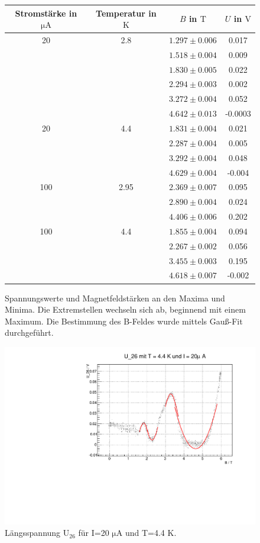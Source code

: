 \begin{figure} [h]
\centering
\caption{Spannungswerte und Magnetfeldstärken an den Maxima und Minima. Die Extremstellen wechseln sich ab, beginnend mit einem Maximum. Die Bestimmung des B-Feldes wurde mittels Gauß-Fit durchgeführt.}
\vspace*{0.5cm}
\begin{tabular}{cccc}
\hline
Stromstärke in $\mathrm{\mu A}$ & Temperatur in $\mathrm{K}$ & $B$ in $\mathrm{T}$ & $U$ in $\mathrm{V}$ \\
\hline
\hline
20	& 2.8	& $1.297 \pm 0.006$ & 0.017 \\
	&		& $1.518 \pm 0.004$ & 0.009 \\
	&		& $1.830 \pm 0.005$ & 0.022 \\
	&		& $2.294 \pm 0.003$ & 0.002 \\
	&		& $3.272 \pm 0.004$ & 0.052 \\
	&		& $4.642 \pm 0.013$ & -0.0003 \\
20  & 4.4  & $1.831 \pm 0.004$ & 0.021 \\
	&		& $2.287 \pm 0.004$ & 0.005 \\
	&		& $3.292 \pm 0.004$ & 0.048 \\
	&		& $4.629 \pm 0.004$ & -0.004 \\
100 & 2.95  & $2.369 \pm 0.007$ & 0.095 \\
	&		& $2.890 \pm 0.004$ & 0.024 \\
	&		& $4.406 \pm 0.006$ & 0.202 \\
100 & 4.4  & $1.855 \pm 0.004$ & 0.094 \\
	&		& $2.267 \pm 0.002$ & 0.056 \\
	&		& $3.455 \pm 0.003$ & 0.195 \\
	&		& $4.618 \pm 0.007$ & -0.002 \\
\hline
\end{tabular}
\end{figure}

\newpage

\begin{figure}
\label{}
\centering
\includegraphics[scale = 0.5]{../plots/U_26_20muA_4400mK.pdf}
\caption{Längsspannung $\mathrm{U_{26}}$ für I=20 $\mathrm{\mu}$A und T=4.4 K.}
\end{figure}

